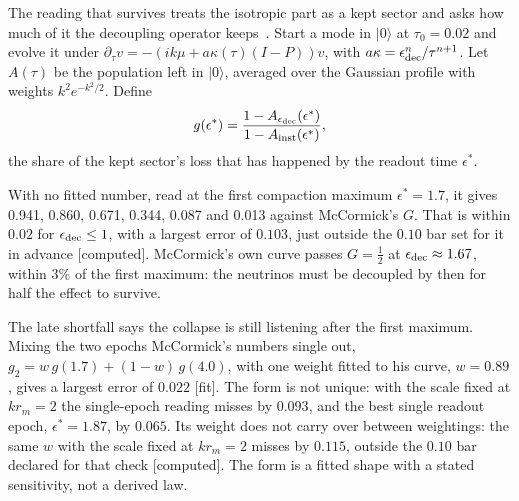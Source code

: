 \documentclass[11pt]{article}
\newcommand{\grade}[1]{\textsf{\small[#1]}}
\begin{document}
The reading that survives treats the isotropic part as a kept sector and asks how much of it the decoupling operator keeps~\cite{WB}. Start a mode in $|0\rangle$ at $\tau_0=0.02$ and evolve it under $\partial_\tau v=-(ik\mu+a\kappa(\tau)(I-P))v$, with $a\kappa=\epsilon_{\rm dec}^n/\tau^{n+1}$. Let $A(\tau)$ be the population left in $|0\rangle$, averaged over the Gaussian profile with weights $k^2e^{-k^2/2}$. Define
\begin{equation}
g(\epsilon^\ast)=\frac{1-A_{\epsilon_{\rm dec}}(\epsilon^\ast)}{1-A_{\rm inst}(\epsilon^\ast)},
\end{equation}
the share of the kept sector's loss that has happened by the readout time $\epsilon^\ast$.

With no fitted number, read at the first compaction maximum $\epsilon^\ast=1.7$, it gives 0.941, 0.860, 0.671, 0.344, 0.087 and 0.013 against McCormick's $G$. That is within $0.02$ for $\epsilon_{\rm dec}\le1$, with a largest error of $0.103$, just outside the $0.10$ bar set for it in advance \grade{computed}. McCormick's own curve passes $G=\tfrac12$ at $\epsilon_{\rm dec}\approx1.67$, within 3\% of the first maximum: the neutrinos must be decoupled by then for half the effect to survive.

The late shortfall says the collapse is still listening after the first maximum. Mixing the two epochs McCormick's numbers single out, $g_2=w\,g(1.7)+(1-w)\,g(4.0)$, with one weight fitted to his curve, $w=0.89$, gives a largest error of $0.022$ \grade{fit}. The form is not unique: with the scale fixed at $kr_m=2$ the single-epoch reading misses by $0.093$, and the best single readout epoch, $\epsilon^\ast=1.87$, by $0.065$. Its weight does not carry over between weightings: the same $w$ with the scale fixed at $kr_m=2$ misses by $0.115$, outside the $0.10$ bar declared for that check \grade{computed}. The form is a fitted shape with a stated sensitivity, not a derived law.
\end{document}
